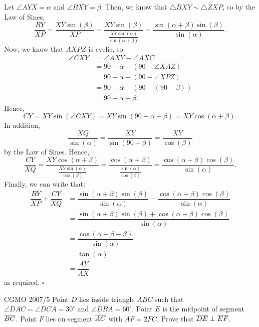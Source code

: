 \documentclass{article}
\begin{document}
Let $\angle AYX = \alpha$ and $\angle BXY = \beta$. Then, we know that $\triangle BXY \sim \triangle ZXP$, so by the Law of Sines, \[\dfrac{BY}{XP} = \dfrac{XY\sin(\beta)}{XP} = \dfrac{XY\sin(\beta)}{\tfrac{XY\sin(\alpha)}{\sin(\alpha+\beta)}} = \dfrac{\sin(\alpha+\beta)\sin(\beta)}{\sin(\alpha)}.\] Now, we know that $AXPZ$ is cyclic, so 
\begin{align*}
\angle CXY &= \angle AXY - \angle AXC \\
&= 90-\alpha-(90-\angle XAZ) \\
&= 90-\alpha-(90-\angle XPZ) \\
&= 90-\alpha-(90-(90-\beta)) \\
&= 90-\alpha-\beta.
\end{align*}
Hence, \[CY = XY\sin(\angle CXY) = XY\sin(90-\alpha-\beta) = XY\cos(\alpha+\beta).\] In addition, \[\dfrac{XQ}{\sin(\alpha)} = \dfrac{XY}{\sin(90+\beta)} = \dfrac{XY}{\cos(\beta)}\] by the Law of Sines. Hence, \[\dfrac{CY}{XQ} = \dfrac{XY\cos(\alpha+\beta)}{\tfrac{XY\sin(\alpha)}{\cos(\beta)}} = \dfrac{\cos(\alpha+\beta)}{\tfrac{\sin(\alpha)}{\cos(\beta)}} = \dfrac{\cos(\alpha+\beta)\cos(\beta)}{\sin(\alpha)}.\] Finally, we can write that:
\begin{align*}
\dfrac{BY}{XP}+\dfrac{CY}{XQ} &= \dfrac{\sin(\alpha+\beta)\sin(\beta)}{\sin(\alpha)} + \dfrac{\cos(\alpha+\beta)\cos(\beta)}{\sin(\alpha)} \\
&= \dfrac{\sin(\alpha+\beta)\sin(\beta)+\cos(\alpha+\beta)\cos(\beta)}{\sin(\alpha)} \\
&= \dfrac{\cos(\alpha+\beta-\beta)}{\sin(\alpha)} \\
&= \tan(\alpha) \\
&= \dfrac{AY}{AX}
\end{align*}
as required. $\square$

\begin{problem}[5.26]{CGMO 2007/5}
Point $D$ lies inside triangle $ABC$ such that $\angle DAC = \angle DCA = 30^\circ$ and $\angle DBA = 60^\circ$. Point $E$ is the midpoint of segment $\overline{BC}$. Point $F$ lies on segment $\overline{AC}$ with $AF = 2FC$. Prove that $\overline{DE} \perp \overline{EF}$. 
\end{problem}
\end{document}
